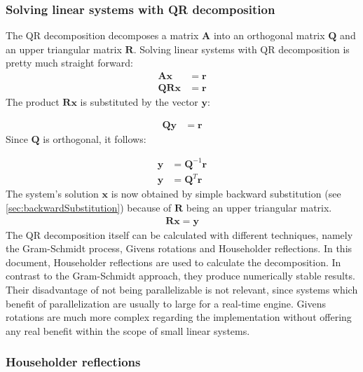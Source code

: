 
\subsubsection{Solving linear systems with QR decomposition}

The QR decomposition decomposes a matrix $\mathbf{A}$ into an orthogonal matrix $\mathbf{Q}$ and an upper triangular matrix $\mathbf{R}$. 
Solving linear systems with QR decomposition is pretty much straight forward:
\begin{align}
\mathbf{A}\mathbf{x} &= \mathbf{r}\\
\mathbf{QR}\mathbf{x} &= \mathbf{r}
\end{align}
%
The product $\mathbf{R}\mathbf{x}$ is substituted by the vector $\mathbf{y}$:

\begin{align}
\mathbf{Qy} &= \mathbf{r}
\end{align}
%
Since $\mathbf{Q}$ is orthogonal, it follows:

\begin{align}
\mathbf{y} &= \mathbf{Q}^{-1}\mathbf{r}\\
\label{eq:qrSolveIntermediate}
\mathbf{y} &= \mathbf{Q}^T\mathbf{r}
\end{align}
%
The system's solution $\mathbf{x}$ is now obtained by simple backward substitution (see \cref{sec:backwardSubstitution}) because of $\mathbf{R}$ being an upper triangular matrix.
\begin{align}
\label{eq:qrSolveResult}
\mathbf{R}\mathbf{x} = \mathbf{y}
\end{align}
%
The QR decomposition itself can be calculated with different techniques, namely the Gram-Schmidt process, Givens rotations and Householder reflections.
In this document, Householder reflections are used to calculate the decomposition.
In contrast to the Gram-Schmidt approach, they produce numerically stable results.
Their disadvantage of not being parallelizable is not relevant, since systems which benefit of parallelization are usually to large for a real-time engine.
Givens rotations are much more complex regarding the implementation without offering any real benefit within the scope of small linear systems. 
 



\subsubsection{Householder reflections}


